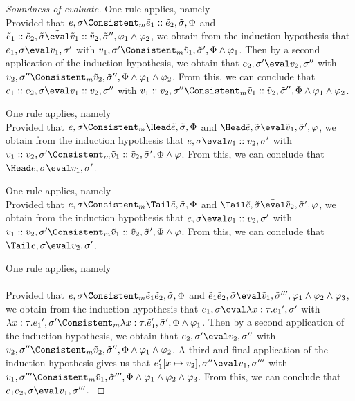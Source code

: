 \begin{proof}[Soundness of evaluate]
    {One rule applies, namely \\
    Provided that $e,\sigma\Consistent_m\tilde{e}_1::\tilde{e}_2,\tilde{\sigma},\Phi$ and $\tilde{e}_1::\tilde{e}_2,\tilde{\sigma}\tilde{\eval}\tilde{v}_1::\tilde{v}_2,\tilde{\sigma}'',\phi_1\land\phi_2$,
    we obtain from the induction hypothesis that $e_1,\sigma\eval v_1,\sigma'$ with $v_1,\sigma'\Consistent_m\tilde{v}_1,\tilde{\sigma}',\Phi\land\phi_1$.
    Then by a second application of the induction hypothesis, we obtain that $e_2,\sigma'\eval v_2,\sigma''$ with $v_2,\sigma''\Consistent_m\tilde{v}_2,\tilde{\sigma}'',\Phi\land\phi_1\land\phi_2$.
    From this, we can conclude that $e_1 :: e_2,\sigma\eval v_1 :: v_2,\sigma''$ with $v_1 :: v_2,\sigma''\Consistent_m\tilde{v}_1 :: \tilde{v}_2,\tilde{\sigma}'',\Phi\land\phi_1\land\phi_2$.
   }

    {One rule applies, namely \\
    Provided that $e,\sigma\Consistent_m\Head \tilde{e},\tilde{\sigma},\Phi$ and $\Head \tilde{e},\tilde{\sigma}\tilde{\eval}\tilde{v}_1,\tilde{\sigma}',\phi$,
    we obtain from the induction hypothesis that $e,\sigma\eval v_1::v_2,\sigma'$ with $v_1::v_2,\sigma'\Consistent_m\tilde{v}_1::\tilde{v}_2,\tilde{\sigma}',\Phi\land\phi$.
    From this, we can conclude that $\Head e,\sigma\eval v_1,\sigma'$.
    }

    {One rule applies, namely \\
    Provided that $e,\sigma\Consistent_m\Tail \tilde{e},\tilde{\sigma},\Phi$ and $\Tail \tilde{e},\tilde{\sigma}\tilde{\eval}\tilde{v}_2,\tilde{\sigma}',\phi$,
    we obtain from the induction hypothesis that $e,\sigma\eval v_1::v_2,\sigma'$ with $v_1::v_2,\sigma'\Consistent_m\tilde{v}_1::\tilde{v}_2,\tilde{\sigma}',\Phi\land\phi$.
    From this, we can conclude that $\Tail e,\sigma\eval v_2,\sigma'$.
      }

    {One rule applies, namely\\ \\

    Provided that $e,\sigma\Consistent_m\tilde{e}_1 \tilde{e}_2,\tilde{\sigma},\Phi$ and $\tilde{e}_1 \tilde{e}_2,\tilde{\sigma}\tilde{\eval}\tilde{v}_1,\tilde{\sigma}''',\phi_1\land\phi_2\land\phi_3$,
    we obtain from the induction hypothesis that $e_1,\sigma\eval \lambda x:\tau.{e_1}',\sigma'$ with $\lambda x:\tau.{e_1}',\sigma'\Consistent_m\lambda x:\tau.\tilde{e}_1',\tilde{\sigma}',\Phi\land\phi_1$.
    Then by a second application of the induction hypothesis, we obtain that $e_2,\sigma'\eval v_2,\sigma''$ with $v_2,\sigma''\Consistent_m\tilde{v}_2,\tilde{\sigma}'',\Phi\land\phi_1\land\phi_2$.
    A third and final application of the induction hypothesis gives us that $e_1'[x\mapsto v_2],\sigma'' \eval v_1,\sigma'''$ with
    $v_1,\sigma'''\Consistent_m\tilde{v}_1,\tilde{\sigma}''',\Phi\land\phi_1\land\phi_2\land\phi_3$.
    From this, we can conclude that $e_1 e_2,\sigma\eval v_1,\sigma'''$.
    }


\end{proof}
